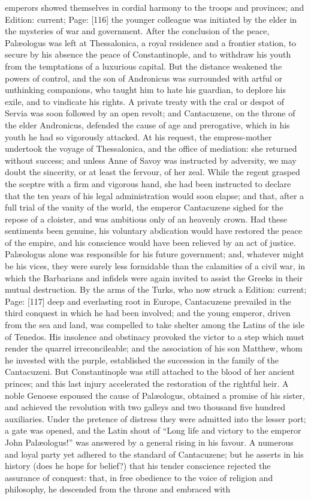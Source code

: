 emperors showed themselves in cordial harmony to the troops and provinces; and Edition: current; Page: [116] the younger colleague was initiated by the elder in the mysteries of war and government. After the conclusion of the peace, Palæologus was left at Thessalonica, a royal residence and a frontier station, to secure by his absence the peace of Constantinople, and to withdraw his youth from the temptations of a luxurious capital. But the distance weakened the powers of control, and the son of Andronicus was surrounded with artful or unthinking companions, who taught him to hate his guardian, to deplore his exile, and to vindicate his rights. A private treaty with the cral or despot of Servia was soon followed by an open revolt; and Cantacuzene, on the throne of the elder Andronicus, defended the cause of age and prerogative, which in his youth he had so vigorously attacked. At his request, the empress-mother undertook the voyage of Thessalonica, and the office of mediation: she returned without success; and unless Anne of Savoy was instructed by adversity, we may doubt the sincerity, or at least the fervour, of her zeal. While the regent grasped the sceptre with a firm and vigorous hand, she had been instructed to declare that the ten years of his legal administration would soon elapse; and that, after a full trial of the vanity of the world, the emperor Cantacuzene sighed for the repose of a cloister, and was ambitious only of an heavenly crown. Had these sentiments been genuine, his voluntary abdication would have restored the peace of the empire, and his conscience would have been relieved by an act of justice. Palæologus alone was responsible for his future government; and, whatever might be his vices, they were surely less formidable than the calamities of a civil war, in which the Barbarians and infidels were again invited to assist the Greeks in their mutual destruction. By the arms of the Turks, who now struck a Edition: current; Page: [117] deep and everlasting root in Europe, Cantacuzene prevailed in the third conquest in which he had been involved; and the young emperor, driven from the sea and land, was compelled to take shelter among the Latins of the isle of Tenedos. His insolence and obstinacy provoked the victor to a step which must render the quarrel irreconcileable; and the association of his son Matthew, whom he invested with the purple, established the succession in the family of the Cantacuzeni. But Constantinople was still attached to the blood of her ancient princes; and this last injury accelerated the restoration of the rightful heir. A noble Genoese espoused the cause of Palæologus, obtained a promise of his sister, and achieved the revolution with two galleys and two thousand five hundred auxiliaries. Under the pretence of distress they were admitted into the lesser port; a gate was opened, and the Latin shout of \texthebrew{“}Long life and victory to the emperor John Palæologus!\texthebrew{}” was answered by a general rising in his favour. A numerous and loyal party yet adhered to the standard of Cantacuzene; but he asserts in his history (does he hope for belief?) that his tender conscience rejected the assurance of conquest: that, in free obedience to the voice of religion and philosophy, he descended from the throne and embraced with 